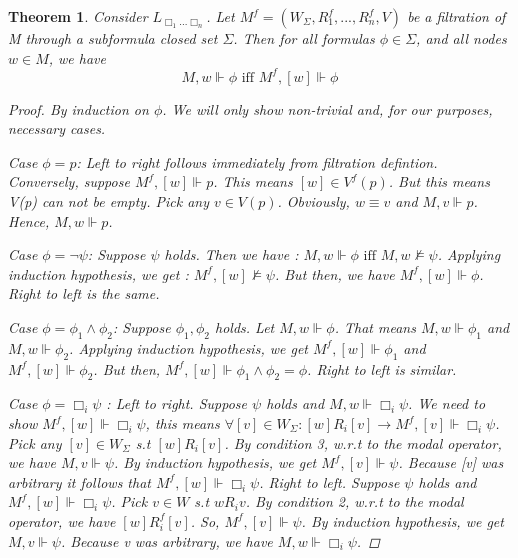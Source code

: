 \documentclass[12pt, a4paper]{scrartcl}
\newtheorem{theorem}[definition]{Theorem}
\begin{document}
\begin{theorem}
    Consider $L_{\Box_1...\Box_n}$. Let $M^f =(W_\Sigma, R^f_1,...,R^f_n, V)$ be a filtration of M through a subformula closed set $\Sigma$.
    Then for all formulas $\phi \in \Sigma$, and all nodes $w \in M$, we have $$M,w \Vdash \phi \mbox{ iff } M^f,[w] \Vdash \phi$$
    
    \begin{proof}
        By induction on $\phi$. We will only show non-trivial and, for our purposes, necessary cases. \newline
        
        Case $\phi = p$: Left to right follows immediately from filtration defintion. Conversely, suppose
        $M^f, [w] \Vdash p$. This means $ [w] \in V^f(p)$. But this means V(p) can not be empty. Pick any $v\in V(p)$. Obviously, $w\equiv v$ and
        $M,v\Vdash p$. Hence, $M,w \Vdash p$. \newline
        
        Case $\phi = \neg \psi$: Suppose $\psi$ holds. Then we have : $M,w \Vdash \phi \mbox{ iff } M,w \nvDash \psi$. Applying 
        induction hypothesis, we get : $M^f, [w] \nvDash \psi$. But then, we have $M^f, [w] \Vdash \phi$. Right to left is the same. \newline
        
        Case $\phi = \phi_1 \land \phi_2$: Suppose $\phi_1, \phi_2$ holds. Let $M,w \Vdash \phi$. That means $M,w \Vdash \phi_1$ and $M,w \Vdash \phi_2$. Applying
        induction hypothesis, we get $M^f,[w] \Vdash \phi_1$ and $M^f,[w] \Vdash \phi_2$. But then, $M^f,[w] \Vdash \phi_1 \land \phi_2 = \phi$. Right to left is similar. \newline
        
        Case $\phi = \Box_i\psi$ : Left to right. Suppose $\psi$ holds and  $M,w \Vdash \Box_i \psi$. 
        We need to show $M^f,[w] \Vdash \Box_i \psi$, this means $\forall [v] \in W_\Sigma : [w]R_i[v] \rightarrow M^f,[v] \Vdash \Box_i \psi$. Pick any $[v] \in W_\Sigma$ s.t 
        $[w]R_i[v]$. By condition 3, w.r.t to the modal operator, we have $M,v \Vdash \psi$. By induction hypothesis, we get $M^f,[v] \Vdash \psi$. Because [v] was arbitrary it follows that $M^f,[w] \Vdash \Box_i \psi$. \newline \newline
        Right to left. Suppose $\psi$ holds and $M^f,[w] \Vdash \Box_i \psi$. Pick $v \in W$ s.t $wR_iv$. By condition 2, w.r.t to the modal operator, we have
        $[w]R^f_i[v]$. So, $M^f, [v] \Vdash \psi$. By induction hypothesis, we get $M,v \Vdash \psi$. Because v was arbitrary, we have $M,w \Vdash \Box_i \psi$.

    
    \end{proof}     
\end{theorem}
\end{document}
